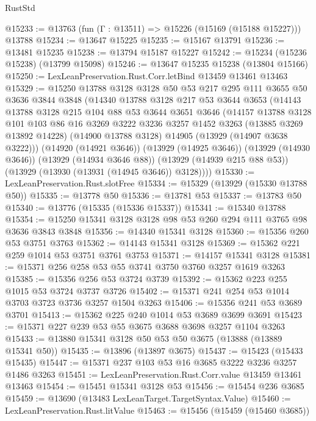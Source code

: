 \begin{lexlean}{RustStd}
\begin{coremodule}
@15233 := @13763 (fun (Γ : @13511) => @15226 (@15169 (@15188 @15227))) @13788
@15234 := @13647 @15225
@15235 := @15167 @13791
@15236 := @13481 @15235
@15238 := @13794 @15187 @15227
@15242 := @15234 (@15236 @15238) (@13799 @15098)
@15246 := @13647 @15235 @15238 (@13804 @15166)
@15250 := LexLeanPreservation.Rust.Corr.letBind @13459 @13461 @13463
@15329 := @15250
    @13788
    @3128
    @3128
    @50
    @53
    @217
    @295
    @111
    @3655
    @50
    @3636
    @3844
    @3848
    (@14340
      @13788
      @3128
      @217
      @53
      @3644
      @3653
      (@14143
        @13788
        @3128
        @215
        @104
        @88
        @53
        @3644
        @3651
        @3646
        (@14157
          @13788
          @3128
          @101
          @103
          @86
          @16
          @3269
          @3222
          @3236
          @3257
          @1452
          @3263
          (@13885 @3269 @13892 @14228)
          (@14900 @13788 @3128)
          @14905
          (@13929 (@14907 @3638 @3222)))
        (@14920 (@14921 @3646))
        (@13929 (@14925 @3646))
        (@13929 (@14930 @3646))
        (@13929 (@14934 @3646 @88))
        (@13929 (@14939 @215 @88 @53))
        (@13929 (@13930 (@13931 (@14945 @3646)) @3128))))
@15330 := LexLeanPreservation.Rust.slotFree
@15334 := @15329 (@13929 (@15330 @13788 @50))
@15335 := @13778 @50
@15336 := @13781 @53
@15337 := @13783 @50
@15340 := @13776 (@15335 (@15336 @15337))
@15341 := @15340 @13788
@15354 := @15250 @15341 @3128 @3128 @98 @53 @260 @294 @111 @3765 @98 @3636 @3843 @3848
@15356 := @14340 @15341 @3128
@15360 := @15356 @260 @53 @3751 @3763
@15362 := @14143 @15341 @3128
@15369 := @15362 @221 @259 @1014 @53 @3751 @3761 @3753
@15371 := @14157 @15341 @3128
@15381 := @15371 @256 @258 @53 @55 @3741 @3750 @3760 @3257 @1619 @3263
@15385 := @15356 @256 @53 @3724 @3739
@15392 := @15362 @223 @255 @1015 @53 @3724 @3737 @3726
@15402 := @15371 @241 @254 @53 @1014 @3703 @3723 @3736 @3257 @1504 @3263
@15406 := @15356 @241 @53 @3689 @3701
@15413 := @15362 @225 @240 @1014 @53 @3689 @3699 @3691
@15423 := @15371 @227 @239 @53 @55 @3675 @3688 @3698 @3257 @1104 @3263
@15433 := @13880 @15341 @3128 @50 @53 @50 @3675 (@13888 (@13889 @15341 @50))
@15435 := @13896 (@13897 @3675)
@15437 := @15423 (@15433 @15435)
@15447 := @15371 @237 @103 @53 @16 @3685 @3222 @3236 @3257 @1486 @3263
@15451 := LexLeanPreservation.Rust.Corr.value @13459 @13461 @13463
@15454 := @15451 @15341 @3128 @53
@15456 := @15454 @236 @3685
@15459 := @13690 (@13483 LexLeanTarget.TargetSyntax.Value)
@15460 := LexLeanPreservation.Rust.litValue
@15463 := @15456 (@15459 (@15460 @3685))

\end{coremodule}
\end{lexlean}

